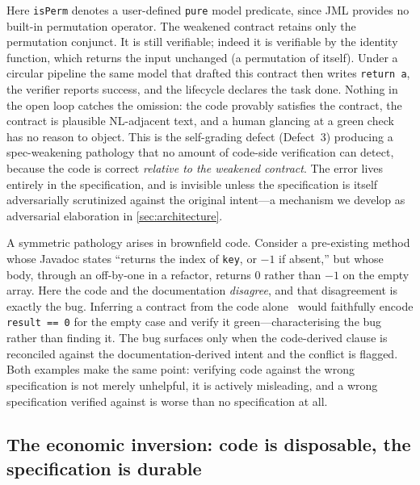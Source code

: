 Here \texttt{isPerm} denotes a user-defined \texttt{pure} model predicate, since JML provides no built-in permutation operator. The weakened contract retains only the permutation conjunct. It is still verifiable; indeed it is verifiable by the identity function, which returns the input unchanged (a permutation of itself). Under a circular pipeline the same model that drafted this contract then writes \texttt{return a}, the verifier reports success, and the lifecycle declares the task done. Nothing in the open loop catches the omission: the code provably satisfies the contract, the contract is plausible NL-adjacent text, and a human glancing at a green check has no reason to object. This is the self-grading defect (Defect~3) producing a spec-weakening pathology that no amount of code-side verification can detect, because the code is correct \emph{relative to the weakened contract}. The error lives entirely in the specification, and is invisible unless the specification is itself adversarially scrutinized against the original intent---a mechanism we develop as adversarial elaboration in \cref{sec:architecture}.

A symmetric pathology arises in brownfield code. Consider a pre-existing method whose Javadoc states ``returns the index of \texttt{key}, or $-1$ if absent,'' but whose body, through an off-by-one in a refactor, returns $0$ rather than $-1$ on the empty array. Here the code and the documentation \emph{disagree}, and that disagreement is exactly the bug. Inferring a contract from the code alone~\cite{ernst2007daikon,edmonds_article3} would faithfully encode \texttt{result == 0} for the empty case and verify it green---characterising the bug rather than finding it. The bug surfaces only when the code-derived clause is reconciled against the documentation-derived intent and the conflict is flagged. Both examples make the same point: verifying code against the wrong specification is not merely unhelpful, it is actively misleading, and a wrong specification verified against is worse than no specification at all.

\subsection{The economic inversion: code is disposable, the specification is durable}
\label{subsec:economic-inversion}

